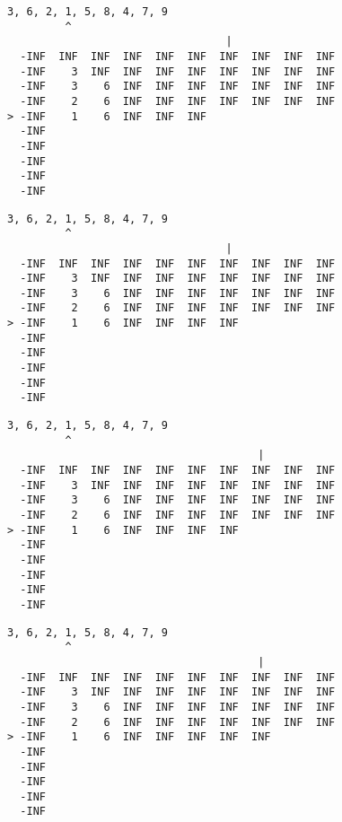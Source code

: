 { \begin{verbatim}
3, 6, 2, 1, 5, 8, 4, 7, 9
         ^
                                  |
  -INF  INF  INF  INF  INF  INF  INF  INF  INF  INF
  -INF    3  INF  INF  INF  INF  INF  INF  INF  INF
  -INF    3    6  INF  INF  INF  INF  INF  INF  INF
  -INF    2    6  INF  INF  INF  INF  INF  INF  INF
> -INF    1    6  INF  INF  INF                    
  -INF                                             
  -INF                                             
  -INF                                             
  -INF                                             
  -INF                                             
\end{verbatim} }

{ \begin{verbatim}
3, 6, 2, 1, 5, 8, 4, 7, 9
         ^
                                  |
  -INF  INF  INF  INF  INF  INF  INF  INF  INF  INF
  -INF    3  INF  INF  INF  INF  INF  INF  INF  INF
  -INF    3    6  INF  INF  INF  INF  INF  INF  INF
  -INF    2    6  INF  INF  INF  INF  INF  INF  INF
> -INF    1    6  INF  INF  INF  INF               
  -INF                                             
  -INF                                             
  -INF                                             
  -INF                                             
  -INF                                             
\end{verbatim} }

{ \begin{verbatim}
3, 6, 2, 1, 5, 8, 4, 7, 9
         ^
                                       |
  -INF  INF  INF  INF  INF  INF  INF  INF  INF  INF
  -INF    3  INF  INF  INF  INF  INF  INF  INF  INF
  -INF    3    6  INF  INF  INF  INF  INF  INF  INF
  -INF    2    6  INF  INF  INF  INF  INF  INF  INF
> -INF    1    6  INF  INF  INF  INF               
  -INF                                             
  -INF                                             
  -INF                                             
  -INF                                             
  -INF                                             
\end{verbatim} }

{ \begin{verbatim}
3, 6, 2, 1, 5, 8, 4, 7, 9
         ^
                                       |
  -INF  INF  INF  INF  INF  INF  INF  INF  INF  INF
  -INF    3  INF  INF  INF  INF  INF  INF  INF  INF
  -INF    3    6  INF  INF  INF  INF  INF  INF  INF
  -INF    2    6  INF  INF  INF  INF  INF  INF  INF
> -INF    1    6  INF  INF  INF  INF  INF          
  -INF                                             
  -INF                                             
  -INF                                             
  -INF                                             
  -INF                                             
\end{verbatim} }

